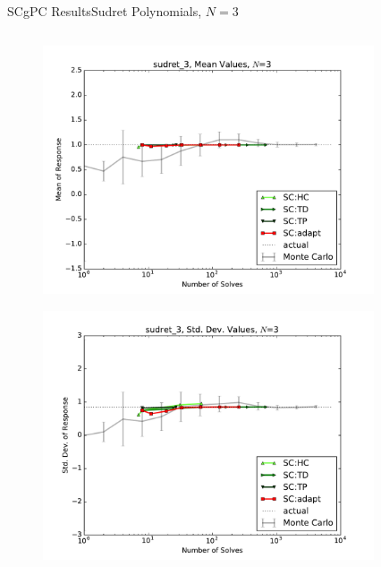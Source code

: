 \documentclass{beamer}
\begin{document}
\begin{frame}{SCgPC Results}{Sudret Polynomials, $N=3$}\vspace{-20pt}
 \begin{columns}
   \begin{column}{0.5\textwidth}
        \begin{figure}[h!]
          \centering
          \includegraphics[width=0.8\linewidth]{anlmodels/sudret_3_mean_vals_nohdmr}
        \end{figure}
        \vspace{-20pt}
        \begin{figure}[h!]
          \centering
          \includegraphics[width=0.8\linewidth]{anlmodels/sudret_3_var_vals_nohdmr}
        \end{figure}
   \end{column}
   \begin{column}{0.5\textwidth}
        \begin{figure}[h!]
          \centering

\end{figure}
\end{column}
\end{columns}
\end{frame}
\end{document}
